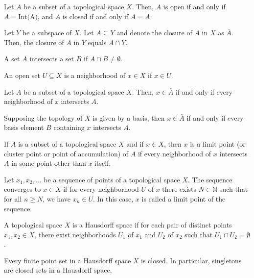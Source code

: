 \documentclass{article}
\begin{document}
    Let $A$ be a subset of a topological space $X$. Then, $A$ is open if and only if $A = \text{Int(A)}$, and $A$ is closed if and only if $A=\overline A$.

\medskip{}

    Let $Y$ be a subspace of $X$. Let $A \subseteq Y$ and denote the closure of $A$ in $X$ as $\overline A$. Then, the closure of $A$ in $Y$ equals $\overline A \cap Y$.

\medskip{}

    A set $A$ intersects a set $B$ if $A \cap B \neq \emptyset$.

\medskip{}

    An open set $U \subseteq X$ is a neighborhood of $x \in X$ if $x \in U$.

\medskip{}

    Let $A$ be a subset of a topological space $X$.
    Then, $x \in \overline A$ if and only if every neighborhood of $x$ intersects $A$.

    Supposing the topology of $X$ is given by a basis, then $x \in \overline A$ if and only if every basis element $B$ containing $x$ intersects $A$.

\medskip{}

    If $A$ is a subset of a topological space $X$ and if $x \in X$, then $x$ is a limit point (or cluster point or point of accumulation) of $A$ if every neighborhood of $x$ intersects $A$ in some point other than $x$ itself.

\medskip{}

    Let $x_1, x_2, \hdots$ be a sequence of points of a topological space $X$.
    The sequence converges to $x \in X$ if for every neighborhood $U$ of $x$ there exists $N \in \mathbb N$ such that for all $n \geq N$, we have $x_n \in U$. 
    In this case, $x$ is called a limit point of the sequence.

\medskip{}

    A topological space $X$ is a Hausdorff space if for each pair of distinct points $x_1, x_2 \in X$, there exist neighborhoods $U_1$ of $x_1$ and $U_2$ of $x_2$ such that $U_1 \cap U_2 = \emptyset$.

\medskip{}

    Every finite point set in a Hausdorff space $X$ is closed. In particular, singletons are closed sets in a Hausdorff space.
\end{document}
